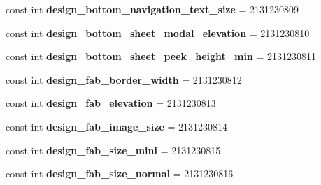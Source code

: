\begin{DoxyCompactItemize}
\mbox{\label{classst_delivery_1_1_resource_1_1_dimension_a62be11593815e17a2732747bd0fccf9e}} 
const int {\bfseries design\+\_\+bottom\+\_\+navigation\+\_\+text\+\_\+size} = 2131230809
\item 
\mbox{\label{classst_delivery_1_1_resource_1_1_dimension_a21e7fde6193011fcfec9ede4ff384432}} 
const int {\bfseries design\+\_\+bottom\+\_\+sheet\+\_\+modal\+\_\+elevation} = 2131230810
\item 
\mbox{\label{classst_delivery_1_1_resource_1_1_dimension_aec4ef87f84f8e16a1155f0374785dffc}} 
const int {\bfseries design\+\_\+bottom\+\_\+sheet\+\_\+peek\+\_\+height\+\_\+min} = 2131230811
\item 
\mbox{\label{classst_delivery_1_1_resource_1_1_dimension_af6e2ed994b359a8ce2beeba54010d319}} 
const int {\bfseries design\+\_\+fab\+\_\+border\+\_\+width} = 2131230812
\item 
\mbox{\label{classst_delivery_1_1_resource_1_1_dimension_a96c1537df7ceaa85c31830e728d58d1a}} 
const int {\bfseries design\+\_\+fab\+\_\+elevation} = 2131230813
\item 
\mbox{\label{classst_delivery_1_1_resource_1_1_dimension_aa55f68fdacc620ed70424fa65a2e1c20}} 
const int {\bfseries design\+\_\+fab\+\_\+image\+\_\+size} = 2131230814
\item 
\mbox{\label{classst_delivery_1_1_resource_1_1_dimension_affd6e531bb0db4bc1384cc78dbe0a786}} 
const int {\bfseries design\+\_\+fab\+\_\+size\+\_\+mini} = 2131230815
\item 
\mbox{\label{classst_delivery_1_1_resource_1_1_dimension_a069c7e999644173d0d2e9926ab444b49}} 
const int {\bfseries design\+\_\+fab\+\_\+size\+\_\+normal} = 2131230816
\item 
\mbox{\label{classst_delivery_1_1_resource_1_1_dimension_a404889d87243b5099a030e13c5bb783c}} 

\end{DoxyCompactItemize}
